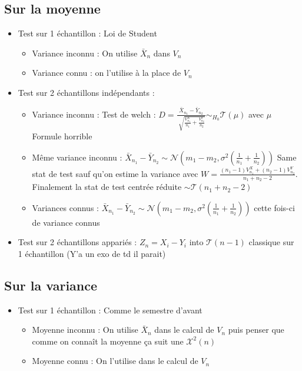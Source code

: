 \documentclass[9pt]{article}
\theoremstyle{plain}%
\theoremstyle{definition}
\theoremstyle{remark}
\begin{document}
\begin{multicols}{3}
\subsection{Sur la moyenne}
\begin{itemize}
    \item Test sur 1 échantillon : Loi de Student \begin{itemize}
        \item Variance inconnu : On utilise $ \bar{X}_n $ dans $ V_n $ 
        \item Variance connu : on l'utilise à la place de $ V_n $ 
    \end{itemize}
    
    \item Test sur 2 échantillons indépendants : \begin{itemize}
        \item Variance inconnu : Test de welch : $ D = \frac{\bar{X}_{n_1} - \bar{Y}_{n_2}}{\sqrt[]{\frac{V_{n_1}^X}{n_1} + \frac{V_{n_2}^Y}{n_2}}} \sim_{H_0} \mathcal{T}(\mu ) $ avec $ \mu $ Formule horrible  
        \item Même variance inconnu : $ \bar{X}_{n_1} - \bar{Y}_{n_2} \sim \mathcal{N}(m_1 - m_2, \sigma ^2 (\frac{1}{n_1} + \frac{1}{n_2}))$ Same stat de test sauf qu'on estime la variance avec $ W = \frac{(n_1 - 1) V_{n_1}^X + (n_2 - 1) V_{n_2}^Y}{n_1 + n_2 - 2}$. Finalement la stat de test centrée réduite $ \sim \mathcal{T}(n_1 + n_2 - 2) $ 
        \item Variances connus :  $ \bar{X}_{n_1} - \bar{Y}_{n_2} \sim \mathcal{N}(m_1 - m_2, \sigma ^2 (\frac{1}{n_1} + \frac{1}{n_2}))$ cette fois-ci de variance connus
    \end{itemize}

    \item Test sur 2 échantillons appariés : $ Z_n = X_i - Y_i $ into $ \mathcal{T}(n-1) $ classique sur 1 échantillon  (Y'a un exo de td il parait)
\end{itemize}

\subsection{Sur la variance}
\begin{itemize}
    \item Test sur 1 échantillon : Comme le semestre d'avant \begin{itemize}
        \item Moyenne inconnu : On utilise $ \bar{X}_n $ dans le calcul de $ V_n $ puis penser que comme on connaît la moyenne ça suit une $ \mathcal{X}^2(n) $ 
        \item Moyenne connu : On l'utilise dans le calcul de $ V_n $ 
    \end{itemize}
    

\end{itemize}
\end{multicols}
\end{document}
